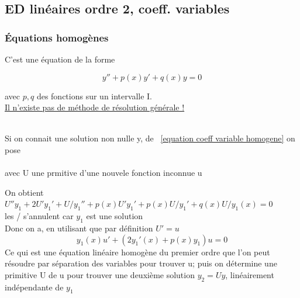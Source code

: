 \documentclass[12pt,a4paper]{article}
\begin{document}
\subsection{ED linéaires ordre 2, coeff. variables}
\subsubsection{Équations homogènes}
C'est une équation de la forme
\begin{boite}
	 \begin{equation}
	 	y'' + p(x)y' + q(x)y = 0
		\label{equation coeff variable homogene}
	\end{equation}
\end{boite}
avec $p,q$ des fonctions sur un intervalle I.\\
\underline{Il n'existe pas de méthode de résolution générale !}\\
\begin{boite}
\\
Si on connait une solution non nulle y, de ~\eqref{equation coeff variable homogene} on pose\\
\\
avec U une prmitive d'une nouvele fonction inconnue u
\end{boite}
On obtient \\
$U''y_1 + 2U'y_1' + U/y_1'' + p(x)U'y_1' + p(x) U/y_1' + q(x)U/y_1(x) = 0$\\
les / s'annulent car $y_1$ est une solution\\
Donc on a, en utilisant que par définition $U' = u$
\begin{equation*}
	y_1(x)u' + (2y_1'(x) + p(x)y_1)u = 0
\end{equation*}
Ce qui est une équation linéaire homogène du premier ordre que l'on peut résoudre par séparation des variables pour trouver u; puis on détermine une primitive U de u pour trouver une deuxième solution $y_2 = Uy$, linéairement indépendante de $y_1$
\end{document}
